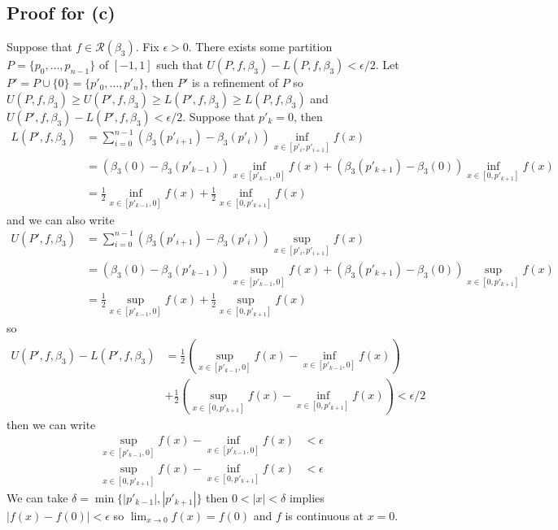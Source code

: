 \documentclass{scrartcl}
\begin{document}
\subsection{Proof for (c)}
Suppose that \(f \in \mathscr{R}(\beta_3)\).
Fix \(\epsilon > 0\).
There exists some partition \(P = \{p_0, \dots, p_{n - 1}\}\) of \([-1, 1]\) such that \(U(P, f, \beta_3) - L(P, f, \beta_3) < \epsilon / 2\).
Let \(P' = P \cup \{0\} = \{p'_0, \dots, p'_n\}\), then \(P'\) is a refinement of \(P\) so \(U(P, f, \beta_3) \geq U(P', f, \beta_3) \geq L(P', f, \beta_3) \geq L(P, f, \beta_3)\) and \(U(P', f, \beta_3) - L(P', f, \beta_3) < \epsilon / 2\).
Suppose that \(p'_k = 0\), then
\begin{align*}
  L(P', f, \beta_3)
  &= \sum^{n - 1}_{i = 0} (\beta_3(p'_{i + 1}) - \beta_3(p'_i)) \inf_{x \in [p'_i, p'_{i + 1}]} f(x) \\
  &= (\beta_3(0) - \beta_3(p'_{k - 1})) \inf_{x \in [p'_{k - 1}, 0]} f(x) + (\beta_3(p'_{k + 1}) - \beta_3(0)) \inf_{x \in [0, p'_{k + 1}]} f(x) \\
  &= \frac{1}{2} \inf_{x \in [p'_{k - 1}, 0]} f(x) + \frac{1}{2} \inf_{x \in [0, p'_{k + 1}]} f(x)
\end{align*}
and we can also write
\begin{align*}
  U(P', f, \beta_3)
  &= \sum^{n - 1}_{i = 0} (\beta_3(p'_{i + 1}) - \beta_3(p'_i)) \sup_{x \in [p'_i, p'_{i + 1}]} f(x) \\
  &= (\beta_3(0) - \beta_3(p'_{k - 1})) \sup_{x \in [p'_{k - 1}, 0]} f(x) + (\beta_3(p'_{k + 1}) - \beta_3(0)) \sup_{x \in [0, p'_{k + 1}]} f(x) \\
  &= \frac{1}{2} \sup_{x \in [p'_{k - 1}, 0]} f(x) + \frac{1}{2} \sup_{x \in [0, p'_{k + 1}]} f(x)
\end{align*}
so
\begin{align*}
  U(P', f, \beta_3) - L(P', f, \beta_3)
  &= \frac{1}{2} \left( \sup_{x \in [p'_{k - 1}, 0]} f(x) - \inf_{x \in [p'_{k - 1}, 0]} f(x) \right) \\
  &+ \frac{1}{2} \left( \sup_{x \in [0, p'_{k + 1}]} f(x) - \inf_{x \in [0, p'_{k + 1}]} f(x) \right) < \epsilon / 2
\end{align*}
then we can write
\begin{align*}
  \sup_{x \in [p'_{k - 1}, 0]} f(x) - \inf_{x \in [p'_{k - 1}, 0]} f(x) &< \epsilon \\
  \sup_{x \in [0, p'_{k + 1}]} f(x) - \inf_{x \in [0, p'_{k + 1}]} f(x) &< \epsilon
\end{align*}
We can take \(\delta = \min \{|p'_{k - 1}|, |p'_{k + 1}|\}\) then \(0 < |x| < \delta\) implies \(|f(x) - f(0)| < \epsilon\) so \(\lim_{x \to 0} f(x) = f(0)\) and \(f\) is continuous at \(x = 0\).
\end{document}

